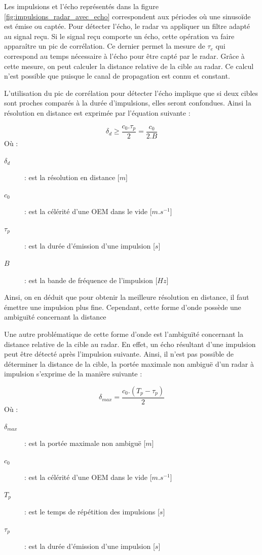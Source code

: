 Les impulsions et l'écho représentés dans la figure \ref{fig:impulsions_radar_avec_echo} correspondent aux périodes où une sinusoïde est émise ou captée. Pour détecter l'écho, le radar va appliquer un filtre adapté au signal reçu. Si le signal reçu comporte un écho, cette opération va faire apparaître un pic de corrélation. Ce dernier permet la mesure de $\tau_e$ qui correspond au temps nécessaire à l'écho pour être capté par le radar. Grâce à cette mesure, on peut calculer la distance relative de la cible au radar. Ce calcul n'est possible que puisque le canal de propagation est connu et constant.

L'utilisation du pic de corrélation pour détecter l'écho implique que si deux cibles sont proches comparés à la durée d'impulsions, elles seront confondues. Ainsi la résolution en distance est exprimée par l'équation suivante \cite{richards2010, radartutorial} :

\begin{equation}
    \delta_d \geq \frac{c_0 . \tau_p}{2} = \frac{c_0}{2. B}
    \label{eq:resolution_distance_pulse}
\end{equation}
Où :
\begin{description}
    \item[$\delta_d$] : est la résolution en distance [$m$]
    \item[$c_0$] : est la célérité d'une OEM dans le vide [$m.s^{-1}$]
    \item[$\tau_p$] : est la durée d'émission d'une impulsion [$s$]
    \item[$B$] : est la bande de fréquence de l'impulsion [$Hz$]
\end{description}

Ainsi, on en déduit que pour obtenir la meilleure résolution en distance, il faut émettre une impulsion plus fine. Cependant, cette forme d'onde possède une ambiguïté concernant la distance 

Une autre problématique de cette forme d'onde est l'ambiguïté concernant la distance relative de la cible au radar. En effet, un écho résultant d'une impulsion peut être détecté après l'impulsion suivante. Ainsi, il n'est pas possible de déterminer la distance de la cible, la portée maximale non ambiguë d'un radar à impulsion s'exprime de la manière suivante \cite{skolnik2001,radartutorial} : 

\begin{equation}
    \delta_{max} = \frac{c_0 . (T_p - \tau_p)}{2}
    \label{eq:resolution_distance_max_radar_pulse}
\end{equation}
Où :
\begin{description}
    \item[$\delta_{max}$] : est la portée maximale non ambiguë [$m$]
    \item[$c_0$] : est la célérité d'une OEM dans le vide [$m.s^{-1}$]
    \item[$T_p$] : est le temps de répétition des impulsions [$s$]
    \item[$\tau_p$] : est la durée d'émission d'une impulsion [$s$]
\end{description}


